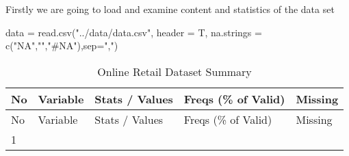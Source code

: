 Firstly we are going to load and examine content and statistics of the
data set

\begin{Schunk}
\begin{Sinput}
data = read.csv("../data/data.csv", header = T, 
                na.strings = c("NA","","#NA"),sep=",")
\end{Sinput}
\end{Schunk}

\begin{longtable}[]{@{}lllll@{}}
\caption{\label{tab:dataset_summary1} Online Retail Dataset
Summary}\tabularnewline
\toprule
\begin{minipage}[b]{0.05\columnwidth}\raggedright
No\strut
\end{minipage} & \begin{minipage}[b]{0.15\columnwidth}\raggedright
Variable\strut
\end{minipage} & \begin{minipage}[b]{0.33\columnwidth}\raggedright
Stats / Values\strut
\end{minipage} & \begin{minipage}[b]{0.23\columnwidth}\raggedright
Freqs (\% of Valid)\strut
\end{minipage} & \begin{minipage}[b]{0.11\columnwidth}\raggedright
Missing\strut
\end{minipage}\tabularnewline
\midrule
\endfirsthead
\toprule
\begin{minipage}[b]{0.05\columnwidth}\raggedright
No\strut
\end{minipage} & \begin{minipage}[b]{0.15\columnwidth}\raggedright
Variable\strut
\end{minipage} & \begin{minipage}[b]{0.33\columnwidth}\raggedright
Stats / Values\strut
\end{minipage} & \begin{minipage}[b]{0.23\columnwidth}\raggedright
Freqs (\% of Valid)\strut
\end{minipage} & \begin{minipage}[b]{0.11\columnwidth}\raggedright
Missing\strut
\end{minipage}\tabularnewline
\midrule
\endhead
\begin{minipage}[t]{0.05\columnwidth}\raggedright
1\strut
\end{minipage} & \begin{minipage}[t]{0.15\columnwidth}\raggedright

\end{minipage}
\end{longtable}
